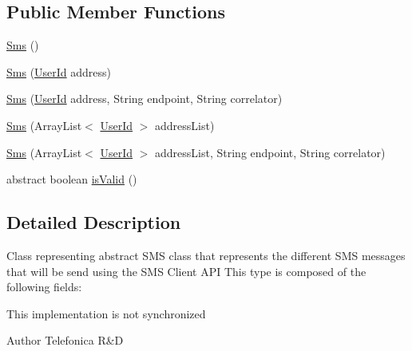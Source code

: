 \subsection*{Public Member Functions}
\begin{DoxyCompactItemize}
\item 
\hyperlink{classcom_1_1bluevia_1_1messagery_1_1mt_1_1sms_1_1data_1_1Sms_a91a46f487f6b0050eaf28953490c7359}{Sms} ()
\item 
\hyperlink{classcom_1_1bluevia_1_1messagery_1_1mt_1_1sms_1_1data_1_1Sms_ab9eb53d7c5c13f6e7ece218cfcd24f01}{Sms} (\hyperlink{classcom_1_1bluevia_1_1commons_1_1data_1_1UserId}{UserId} address)
\item 
\hyperlink{classcom_1_1bluevia_1_1messagery_1_1mt_1_1sms_1_1data_1_1Sms_a144cdaaea7d32e8109e6e62e5ac46fbc}{Sms} (\hyperlink{classcom_1_1bluevia_1_1commons_1_1data_1_1UserId}{UserId} address, String endpoint, String correlator)
\item 
\hyperlink{classcom_1_1bluevia_1_1messagery_1_1mt_1_1sms_1_1data_1_1Sms_af0b7b4ae5d02037c5e758b634d993c4c}{Sms} (ArrayList$<$ \hyperlink{classcom_1_1bluevia_1_1commons_1_1data_1_1UserId}{UserId} $>$ addressList)
\item 
\hyperlink{classcom_1_1bluevia_1_1messagery_1_1mt_1_1sms_1_1data_1_1Sms_a8d0809d986356afcbeea9516c18edcb1}{Sms} (ArrayList$<$ \hyperlink{classcom_1_1bluevia_1_1commons_1_1data_1_1UserId}{UserId} $>$ addressList, String endpoint, String correlator)
\item 
abstract boolean \hyperlink{classcom_1_1bluevia_1_1messagery_1_1mt_1_1sms_1_1data_1_1Sms_a0358ec0edbe7b82978d2bd49a8c96022}{isValid} ()
\end{DoxyCompactItemize}


\subsection{Detailed Description}
Class representing abstract SMS class that represents the different SMS messages that will be send using the SMS Client API This type is composed of the following fields:

This implementation is not synchronized

\begin{DoxyAuthor}{Author}
Telefonica R\&D 
\end{DoxyAuthor}


